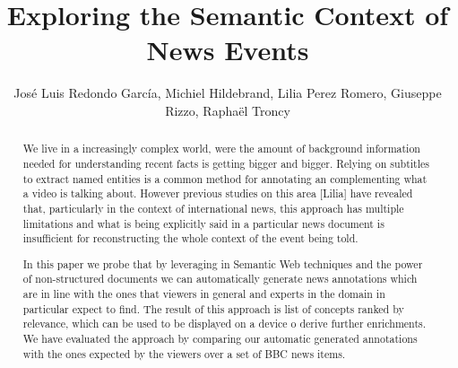 \documentclass{llncs}
\begin{document}
\frontmatter          %
\pagestyle{headings}  %
\mainmatter              %

\title{Exploring the Semantic Context of News Events}
\author{Jos\'e Luis Redondo Garc\'ia, Michiel Hildebrand, Lilia Perez Romero, Giuseppe Rizzo, Rapha\"el Troncy}


\maketitle              %


\begin{abstract}

We live in a increasingly complex world, were the amount of background information needed for understanding recent facts is getting bigger and bigger. Relying on subtitles to extract named entities is a common method for annotating an complementing what a video is talking about. However previous studies on this area [Lilia] have revealed that, particularly in the context of international news, this approach has multiple limitations and what is being explicitly said in a particular news document is insufficient for reconstructing the whole context of the event being told. 

In this paper we probe that by leveraging in Semantic Web techniques and the power of non-structured documents we can automatically generate news annotations which are in line with the ones that viewers in general and experts in the domain in particular expect to find. The result of this approach is list of concepts ranked by relevance, which can be used to be displayed on a device o derive further enrichments. We have evaluated the approach by comparing our automatic generated annotations with the ones expected by the viewers over a set of BBC news items.

\end{abstract}

\end{document}
